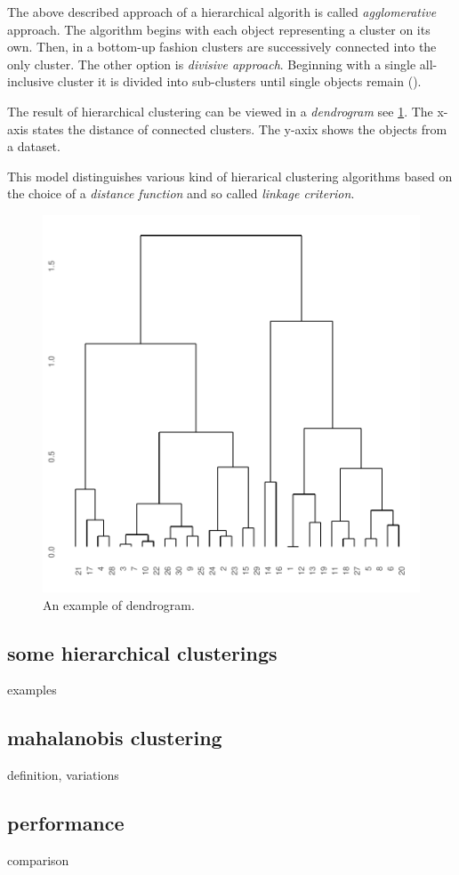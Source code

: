 The above described approach of a hierarchical algorith is called \emph{agglomerative} approach. The algorithm begins with each object representing a cluster on its own. Then, in a bottom-up fashion clusters are successively connected into the only cluster. The other option is \emph{divisive approach}. Beginning with a single all-inclusive cluster it is divided into sub-clusters until single objects remain (\cite{rokach2005clustering}). 

The result of hierarchical clustering can be viewed in a \emph{dendrogram} see \ref{fig01:dendro}. The x-axis states the distance of connected clusters. The y-axix shows the objects from a dataset.

This model distinguishes various kind of hierarical clustering algorithms based on the choice of a \emph{distance function} and so called \emph{linkage criterion}. 

\begin{figure}\centering
	\includegraphics{img/dendro}
	\caption{An example of dendrogram.}
	\label{fig01:dendro}
	
\end{figure}

\subsection{some hierarchical clusterings}

examples

\subsection{mahalanobis clustering}

definition, variations

\subsection{performance}

comparison